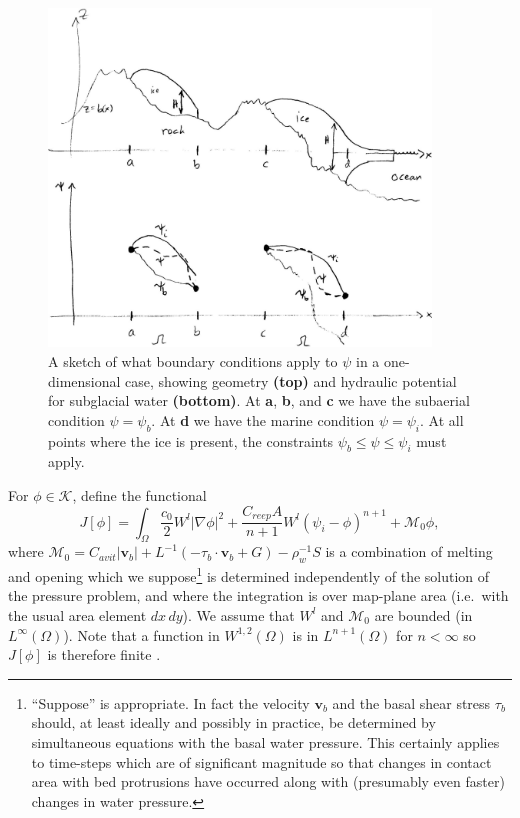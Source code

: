\documentclass[11pt]{amsart}
\newcommand{\bv}{\mathbf{v}}
\newcommand{\Cavit}{C_{avit}}
\newcommand{\Creep}{C_{reep}}
\begin{document}
\begin{figure}[ht]
\centering
\includegraphics[width=4.0in,keepaspectratio=true]{figs/boundary_cartoon}
\caption{A sketch of what boundary conditions apply to $\psi$ in a one-dimensional case, showing geometry \textbf{(top)} and hydraulic potential for subglacial water \textbf{(bottom)}.  At \textbf{a}, \textbf{b}, and \textbf{c} we have the subaerial condition $\psi=\psi_b$.  At \textbf{d} we have the marine condition $\psi=\psi_i$.  At all points where the ice is present, the constraints $\psi_b\le \psi \le \psi_i$ must apply.}
\label{fig:boundary}
\end{figure}

For $\phi \in \mathcal{K}$, define the functional
\begin{equation}\label{eq:functionalJ}
   J[\phi] = \int_\Omega \frac{c_0}{2} W^l |\nabla \phi|^2 + \frac{\Creep A }{n+1} W^l \left(\psi_i - \phi\right)^{n+1} + \mathcal{M}_0 \phi,
\end{equation}
where $\mathcal{M}_0 = \Cavit |\bv_b| + L^{-1} (-\tau_b \cdot \bv_b + G) - \rho_w^{-1} S$ is a combination of melting and opening which we suppose\footnote{``Suppose'' is appropriate.  In fact the velocity $\bv_b$ and the basal shear stress $\tau_b$ should, at least ideally and possibly in practice, be determined by simultaneous equations with the basal water pressure.  This certainly applies to time-steps which are of significant magnitude so that changes in contact area with bed protrusions have occurred along with (presumably even faster) changes in water pressure.} is determined independently of the solution of the pressure problem, and where the integration is over map-plane area (i.e.~with the usual area element $dx\,dy$).  We assume that $W^l$ and $\mathcal{M}_0$  are bounded (in $L^\infty(\Omega)$).  Note that a function in $W^{1,2}(\Omega)$ is in $L^{n+1}(\Omega)$ for $n<\infty$ so $J[\phi]$ is therefore finite \citep{Evans}.
\end{document}
